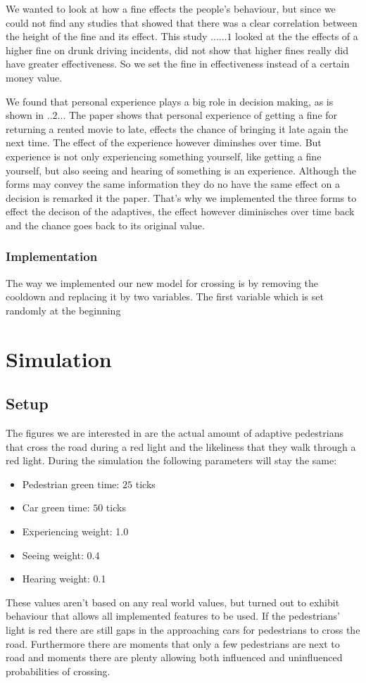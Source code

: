 \documentclass[a4paper]{article}
\begin{document}
We wanted to look at how a fine effects the people's behaviour, but since we could not find any studies that showed that there was a clear correlation between the height of the fine and its effect. This study ......$1$ looked at the the effects of a higher fine on drunk driving incidents, did not show that higher fines really did have greater effectiveness. So we set the fine in effectiveness instead of a certain money value. 

We found that personal experience plays a big role in decision making, as is shown in ..$2$... The paper shows that personal experience of getting a fine for returning a rented movie to late, effects the chance of bringing it late again the next time. The effect of the experience however diminshes over time. But experience is not only experiencing something yourself, like getting a fine yourself, but also seeing and hearing of something is an experience. Although the forms may convey the same information they do no have the same effect on a decision is remarked it the paper. That's why we implemented the three forms to effect the decison of the adaptives, the effect however diminisches over time back and the chance goes back to its original value.

\subsubsection{Implementation}

The way we implemented our new model for crossing is by removing the cooldown and replacing it by two variables. The first variable which is set randomly at the beginning 

\clearpage

\section{Simulation}
\subsection{Setup}
The figures we are interested in are the actual amount of adaptive pedestrians that cross the road during a red light and the likeliness that they walk through a red light. During the simulation the following parameters will stay the same:
\begin{itemize}
\item Pedestrian green time: $25$ ticks
\item Car green time: $50$ ticks
\item Experiencing weight: 1.0
\item Seeing weight: 0.4
\item Hearing weight: 0.1
\end{itemize}
These values aren't based on any real world values, but turned out to exhibit behaviour that allows all implemented features to be used. If the pedestrians' light is red there are still gaps in the approaching cars for pedestrians to cross the road. Furthermore there are moments that only a few pedestrians are next to road and moments there are plenty allowing both influenced and uninfluenced probabilities of crossing. 
\end{document}
